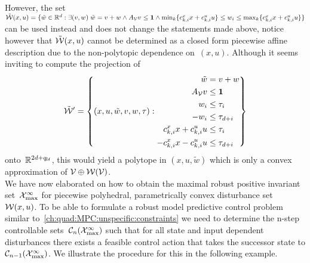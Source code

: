 %
However, the set~$\tilde{\mathcal W}(x,u) = \{\tilde w\in\mathbb R^d:\exists(v,w)\;\tilde w = v+w\wedge A_\mathcal V v\leq\mathbf{1}\wedge\min_{k}\{c_{k,i}^x x + c_{k,i}^u u\} \leq w_i\allowbreak \leq\max_k\{c_{k,i}^x x + c_{k,i}^u u\}\}$ can be used instead and does not change the statements made above, notice however that $\tilde{\mathcal W}(x,u)$ cannot be determined as a closed form piecewise affine description due to the non-polytopic dependence on~$(x,u)$.
%
Although it seems inviting to compute the projection of
%
\[
	\tilde{\mathcal W}^\prime = \left\{(x,u,\tilde w,v,w,\tau):\begin{aligned}\tilde w&=v+w\\
	A_\mathcal V v&\leq\mathbf{1}\\
	w_i&\leq\tau_i\\
	-w_i&\leq\tau_{d+i}\\
	c_{k,i}^x x + c_{k,i}^u u&\leq \tau_i\\
	-c_{k,i}^x x - c_{k,i}^u u&\leq \tau_{d+i}
	\end{aligned}\right\}
\]
%
onto~$\mathbb R^{2d+q_\mathcal U}$, this would yield a polytope in $(x,u,\tilde w)$ which is only a convex approximation of $\mathcal V\oplus\mathcal W(\mathcal V)$.
%
\\[2em]
%
\mysplit We have now elaborated on how to obtain the maximal robust positive invariant set~$\mathcal X^\infty_{\max}$ for piecewise polyhedral, parametrically convex disturbance set~$\mathcal W(x,u)$.
%
To be able to formulate a robust model predictive control problem similar to~\eqref{ch:quad:MPC:unspecific:constraints} we need to determine the n-step controllable sets~$\mathcal C_n(\mathcal X^\infty_{\max})$ such that for all state and input dependent disturbances there exists a feasible control action that takes the successor state to $\mathcal C_{n-1}(\mathcal X^\infty_{\max})$.
%
We illustrate the procedure for this in the following example.
%
